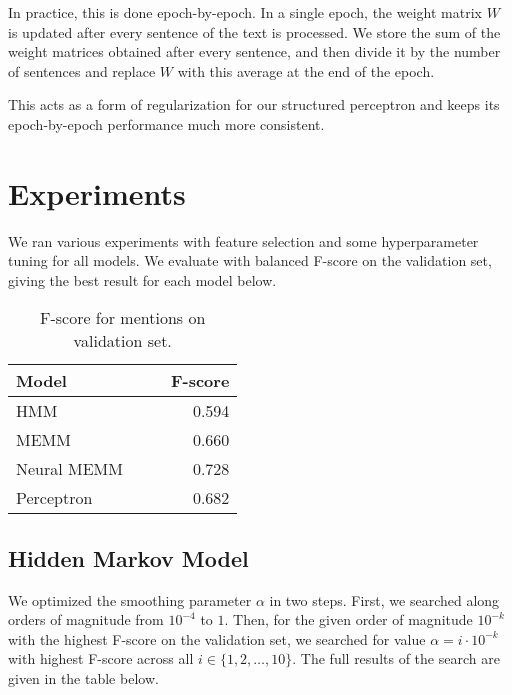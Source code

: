 \documentclass[11pt]{article}
\begin{document}
In practice, this is done epoch-by-epoch. In a single epoch, the weight matrix $W$ is updated after every sentence of the text is processed. We store the sum of the weight matrices obtained after every sentence, and then divide it by the number of sentences and replace $W$ with this average at the end of the epoch. 

This acts as a form of regularization for our structured perceptron and keeps its epoch-by-epoch performance much more consistent. 

\section{Experiments}

We ran various experiments with feature selection and some hyperparameter tuning for all models. We evaluate with balanced F-score on the validation set, giving the best result for each model below. 

\begin{table}[h]
\centering
\begin{tabular}{lccr}
 \toprule
 Model &  &  & F-score \\
 \midrule
 HMM & & & 0.594 \\
 MEMM & & & 0.660 \\
 Neural MEMM & & & 0.728 \\
 Perceptron & & & 0.682
\end{tabular}
\caption{\label{tab:results} F-score for mentions on validation set.}
\end{table}

\subsection{Hidden Markov Model}


We optimized the smoothing parameter $\alpha$ in two steps. First, we searched along orders of magnitude from $10^{-4}$ to $1$. Then, for the given order of magnitude $10^{-k}$ with the highest F-score on the validation set, we searched for value $\alpha = i \cdot 10^{-k}$ with highest F-score across all $i \in \{1, 2, \dots, 10\}$. The full results of the search are given in the table below. 
\end{document}
